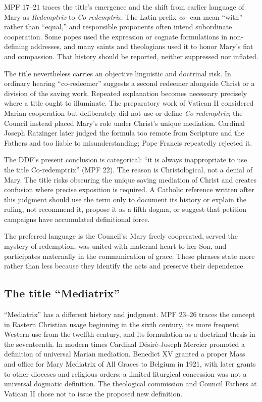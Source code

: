MPF 17--21 traces the title's emergence and the shift from earlier language of Mary as \emph{Redemptrix} to \emph{Co-redemptrix}. The Latin prefix \emph{co-} can mean ``with'' rather than ``equal,'' and responsible proponents often intend subordinate cooperation. Some popes used the expression or cognate formulations in non-defining addresses, and many saints and theologians used it to honor Mary's fiat and compassion. That history should be reported, neither suppressed nor inflated.

The title nevertheless carries an objective linguistic and doctrinal risk. In ordinary hearing ``co-redeemer'' suggests a second redeemer alongside Christ or a division of the saving work. Repeated explanation becomes necessary precisely where a title ought to illuminate. The preparatory work of Vatican II considered Marian cooperation but deliberately did not use or define \emph{Co-redemptrix}; the Council instead placed Mary's role under Christ's unique mediation. Cardinal Joseph Ratzinger later judged the formula too remote from Scripture and the Fathers and too liable to misunderstanding; Pope Francis repeatedly rejected it.

The DDF's present conclusion is categorical: ``it is always inappropriate to use the title Co-redemptrix'' (MPF 22). The reason is Christological, not a denial of Mary. The title risks obscuring the unique saving mediation of Christ and creates confusion where precise exposition is required. A Catholic reference written after this judgment should use the term only to document its history or explain the ruling, not recommend it, propose it as a fifth dogma, or suggest that petition campaigns have accumulated definitional force.

The preferred language is the Council's: Mary freely cooperated, served the mystery of redemption, was united with maternal heart to her Son, and participates maternally in the communication of grace. These phrases state more rather than less because they identify the acts and preserve their dependence.

\subsection{The title ``Mediatrix''}

``Mediatrix'' has a different history and judgment. MPF 23--26 traces the concept in Eastern Christian usage beginning in the sixth century, its more frequent Western use from the twelfth century, and its formulation as a doctrinal thesis in the seventeenth. In modern times Cardinal D\'esir\'e-Joseph Mercier promoted a definition of universal Marian mediation. Benedict XV granted a proper Mass and office for Mary Mediatrix of All Graces to Belgium in 1921, with later grants to other dioceses and religious orders; a limited liturgical concession was not a universal dogmatic definition. The theological commission and Council Fathers at Vatican II chose not to issue the proposed new definition.

